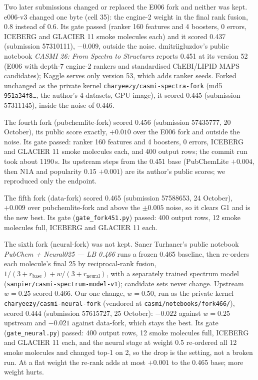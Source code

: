\documentclass[11pt]{article}
\begin{document}
Two later submissions changed or replaced the E006 fork and neither was kept. e006-v3 changed one
byte (cell 35): the engine-2 weight in the final rank fusion, 0.8 instead of 0.6. Its gate passed
(ranker 160 features and 4 boosters, 0 errors, ICEBERG and GLACIER 11 smoke molecules each) and it
scored 0.437 (submission 57310111), $-0.009$, outside the noise. dmitriigluzdov's public notebook
\emph{CASMI 26: From Spectra to Structures} reports 0.451 at its version 52 (E006 with depth-7
engine-2 rankers and standardised ChEBI/LIPID MAPS candidates); Kaggle serves only version 53, which
adds ranker seeds. Forked unchanged as the private kernel \texttt{charyeezy/casmi-spectra-fork} (md5
\texttt{951a34f8\ldots}, the author's 4 datasets, GPU image), it scored 0.445 (submission 57311145),
inside the noise of 0.446.

The fourth fork (pubchemlite-fork) scored 0.456 (submission 57435777, 20 October), its public score
exactly, $+0.010$ over the E006 fork and outside the noise. Its gate passed: ranker 160 features and 4
boosters, 0 errors, ICEBERG and GLACIER 11 smoke molecules each, and 400 output rows; the commit run
took about 1190\,s. Its upstream steps from the 0.451 base (PubChemLite $+0.004$, then N1A and
popularity 0.15 $+0.001$) are its author's public scores; we reproduced only the endpoint.

The fifth fork (data-fork) scored 0.465 (submission 57588653, 24 October), $+0.009$ over pubchemlite-fork
and above the $\pm 0.005$ noise, so it clears G1 and is the new best. Its gate (\texttt{gate\_fork451.py})
passed: 400 output rows, 12 smoke molecules full, ICEBERG and GLACIER 11 each.

The sixth fork (neural-fork) was not kept. Saner Turhaner's public notebook \emph{PubChem + Neural025 --- LB
0.466} runs a frozen 0.465 baseline, then re-orders each molecule's final 25 by reciprocal-rank fusion,
$1/(3 + r_\text{base}) + w/(3 + r_\text{neural})$, with a separately trained spectrum model
(\nolinkurl{sanpier/casmi-spectrum-model-v1}); candidate sets never change. Upstream $w = 0.25$ scored 0.466.
Our one change, $w = 0.50$, run as the private kernel \nolinkurl{charyeezy/casmi-neural-fork} (vendored at
\nolinkurl{casmi/notebooks/fork466/}), scored 0.444 (submission 57615727, 25 October): $-0.022$ against
$w = 0.25$ upstream and $-0.021$ against data-fork, which stays the best. Its gate
(\texttt{gate\_neural.py}) passed: 400 output rows, 12 smoke molecules full, ICEBERG and GLACIER 11 each,
and the neural stage at weight 0.5 re-ordered all 12 smoke molecules and changed top-1 on 2, so the drop
is the setting, not a broken run. At a flat weight the re-rank adds at most $+0.001$ to the 0.465 base;
more weight hurts.
\end{document}
